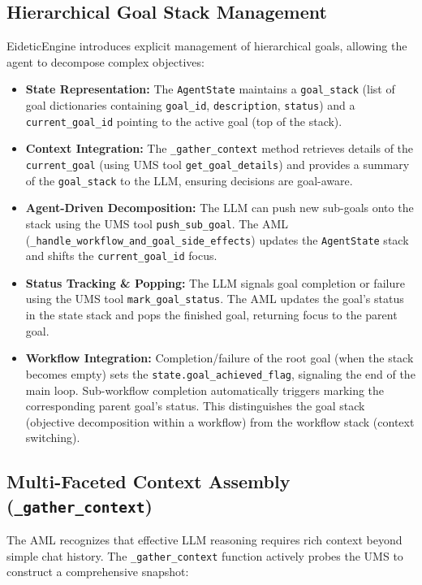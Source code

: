 \documentclass[12pt,a4paper]{article}
\newcommand{\code}[1]{\nolinkurl{#1}}
\begin{document}
\subsection{Hierarchical Goal Stack Management}

EideticEngine introduces explicit management of hierarchical goals, allowing the agent to decompose complex objectives:

\begin{itemize}
    \item \textbf{State Representation:} The \code{AgentState} maintains a \code{goal\_stack} (list of goal dictionaries containing \code{goal\_id}, \code{description}, \code{status}) and a \code{current\_goal\_id} pointing to the active goal (top of the stack).
    \item \textbf{Context Integration:} The \code{\_gather\_context} method retrieves details of the \code{current\_goal} (using UMS tool \code{get\_goal\_details}) and provides a summary of the \code{goal\_stack} to the LLM, ensuring decisions are goal-aware.
    \item \textbf{Agent-Driven Decomposition:} The LLM can push new sub-goals onto the stack using the UMS tool \code{push\_sub\_goal}. The AML (\code{\_handle\_workflow\_and\_goal\_side\_effects}) updates the \code{AgentState} stack and shifts the \code{current\_goal\_id} focus.
    \item \textbf{Status Tracking \& Popping:} The LLM signals goal completion or failure using the UMS tool \code{mark\_goal\_status}. The AML updates the goal's status in the state stack and pops the finished goal, returning focus to the parent goal.
    \item \textbf{Workflow Integration:} Completion/failure of the root goal (when the stack becomes empty) sets the \code{state.goal\_achieved\_flag}, signaling the end of the main loop. Sub-workflow completion automatically triggers marking the corresponding parent goal's status. This distinguishes the goal stack (objective decomposition within a workflow) from the workflow stack (context switching).
\end{itemize}

\subsection{Multi-Faceted Context Assembly (\code{\_gather\_context})}

The AML recognizes that effective LLM reasoning requires rich context beyond simple chat history. The \code{\_gather\_context} function actively probes the UMS to construct a comprehensive snapshot:
\end{document}
